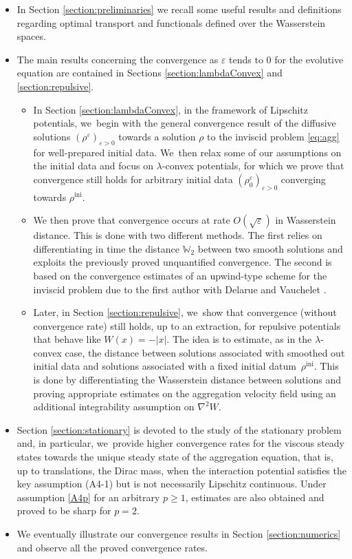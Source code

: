 \documentclass[11pt]{article}
\numberwithin{equation}{section}
\newcommand{\ini}{\mathrm{ini}}
\def\WW{\mathbb{W}}
\def\eps{\varepsilon}
\theoremstyle{plain}
\theoremstyle{definition}
\begin{document}
\begin{itemize}
\item
In Section \ref{section:preliminaries} we recall some useful results and definitions regarding optimal transport and functionals defined over the Wasserstein spaces.

\item
The main results concerning the convergence as $\eps$ tends to 0 for the evolutive equation are contained in Sections \ref{section:lambdaConvex} and \ref{section:repulsive}.

\begin{itemize}
\item In Section \ref{section:lambdaConvex}, in the framework of Lipschitz potentials, we~begin with the general convergence result of the diffusive solutions $(\rho^\eps)_{\eps>0}$ towards a solution $\rho$ to the inviscid problem \eqref{eq:agg} for well-prepared initial data. We~then relax some of our assumptions on the initial data and focus on $\lambda$-convex potentials, for which we prove that convergence still holds for arbitrary initial data $(\rho_0^\eps)_{\eps >0}$ converging towards $\rho^{\ini}$. \item We then prove that convergence occurs at rate $O(\sqrt{\eps})$ in Wasserstein distance. This is done with two different methods. The first relies on differentiating in time the distance $\WW_2$ between two smooth solutions and exploits the previously proved unquantified convergence. The second is based on the convergence estimates of an upwind-type scheme for the inviscid problem due to the first author with Delarue and Vauchelet \cite{dlv17, dlv20}.

\item Later, in Section \ref{section:repulsive}, we~show that convergence (without convergence rate) still holds, up to an extraction, for repulsive potentials that behave like $W(x) = -|x|$. The idea is to estimate, as in the $\lambda$-convex case, the distance between solutions associated with smoothed out initial data and solutions associated with a fixed initial datum~$\rho^{\ini}$. This is done by differentiating the Wasserstein distance between solutions and proving appropriate estimates on the aggregation velocity field using an additional integrability assumption on $\nabla^2 W$.
\end{itemize}
\item
Section \ref{section:stationary} is devoted to the study of the stationary problem and, in particular, we~provide higher convergence rates for the viscous steady states towards the unique steady state of the aggregation equation, that is, up to translations, the Dirac mass, when the interaction potential satisfies the key assumption (A4-1) but is not necessarily Lipschitz continuous. Under assumption \eqref{A4p} for an arbitrary $p\geq 1$, estimates are also obtained and proved to be sharp for $p=2$.

\item
We eventually illustrate our convergence results in Section \ref{section:numerics} and observe all the proved convergence rates.
\end{itemize}
\end{document}
